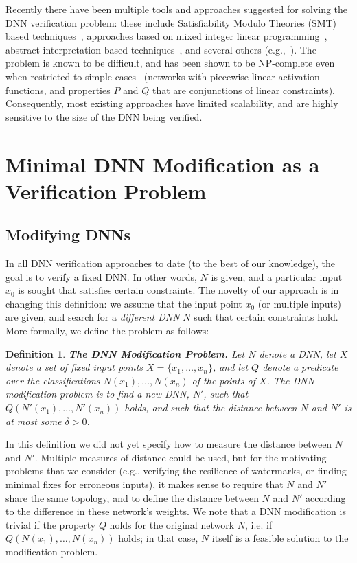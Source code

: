 \documentclass{easychair}
\newtheorem{definition}{Definition}
\begin{document}
Recently there have been multiple tools and approaches suggested for
solving the DNN verification problem: these include Satisfiability
Modulo Theories (SMT) based
techniques~\cite{KaBaDiJuKo17Reluplex,KaHuIbJuLaLiShThWuZeDiKoBa19Marabou},
approaches based on mixed integer linear
programming~\cite{Ehlers2017,TjXiTe19}, abstract interpretation based
techniques~\cite{GeMiDrTsChVe18}, and several others
(e.g.,~\cite{HuKwWaWu17,NaKaRySaWa17}). The problem is known to be
difficult, and has been shown to be NP-complete even when restricted
to simple cases~\cite{KaBaDiJuKo17Reluplex} (networks with
piecewise-linear activation functions, and properties $P$ and $Q$ that
are conjunctions of linear constraints). Consequently, most existing approaches
have limited scalability, and are highly sensitive to the size of the
DNN being verified.


\section{Minimal DNN Modification as a Verification Problem}
\label{sec:verifyWatermarks}

\subsection{Modifying DNNs}

In all DNN verification approaches to date (to the best of our
knowledge), the goal is to verify a fixed DNN. In other words, $N$ is
given, and a particular input $x_0$ is sought that satisfies certain constraints.
The novelty of our approach is in changing this definition: we assume
that the input point $x_0$ (or multiple inputs) are given, and search for a
\emph{different DNN} $N$ such that certain constraints hold.
More formally, we define the problem as follows:

\begin{definition}\textbf{The DNN Modification Problem.}
  Let $N$ denote a DNN, let $X$ denote a set of fixed input points
  $X=\{x_1, \ldots, x_n\}$, and let $Q$ denote a predicate over the
  classifications $N(x_1),\ldots,N(x_n)$ of the points of $X$. The
  \emph{DNN modification problem} is to find a new DNN, $N'$, such that
  $Q(N'(x_1),\ldots,N'(x_n))$ holds, and such that the distance
  between $N$ and $N'$ is at most some $\delta>0$.
\end{definition}

In this definition we did not yet specify how to measure the distance
between $N$ and $N'$. Multiple measures of distance could be used, but for the
motivating problems that we consider (e.g., verifying the resilience
of watermarks, or finding minimal fixes for erroneous inputs), it
makes sense to require that $N$ and $N'$ share the same topology, and
to define the distance between $N$ and $N'$ according to the
difference in these network's weights. We note that a DNN modification
is trivial if the property $Q$ holds for the original network $N$,
i.e. if $Q(N(x_1),\ldots,N(x_n))$ holds; in that case, $N$ itself is a
feasible solution to the modification problem.
\end{document}
